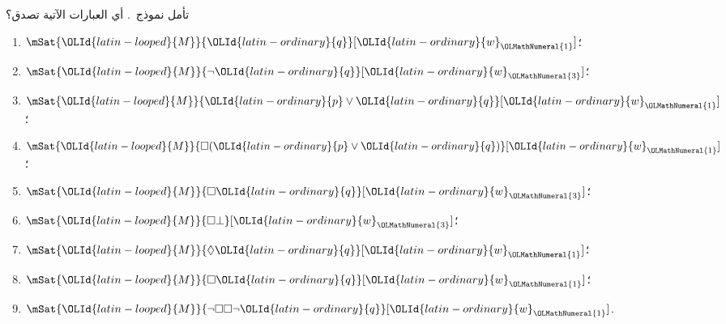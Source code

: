 \documentclass[../../../include/open-logic-section]{subfiles}
\begin{document}
\begin{prob}
  تأمل نموذج~. أي العبارات الآتية
  تصدق؟
    \begin{enumerate}
    \item $\mSat{{\OLId{latin-looped}{M}}}{{\OLId{latin-ordinary}{q}}}[{\OLId{latin-ordinary}{w}}_{\OLMathNumeral{1}}]$؛
    \item $\mSat{{\OLId{latin-looped}{M}}}{\lnot {\OLId{latin-ordinary}{q}}}[{\OLId{latin-ordinary}{w}}_{\OLMathNumeral{3}}]$؛
    \item $\mSat{{\OLId{latin-looped}{M}}}{{\OLId{latin-ordinary}{p}} \lor {\OLId{latin-ordinary}{q}}}[{\OLId{latin-ordinary}{w}}_{\OLMathNumeral{1}}]$؛
    \item $\mSat{{\OLId{latin-looped}{M}}}{\Box ({\OLId{latin-ordinary}{p}} \lor {\OLId{latin-ordinary}{q}})}[{\OLId{latin-ordinary}{w}}_{\OLMathNumeral{1}}]$؛
    \item $\mSat{{\OLId{latin-looped}{M}}}{\Box {\OLId{latin-ordinary}{q}}}[{\OLId{latin-ordinary}{w}}_{\OLMathNumeral{3}}]$؛
    \item $\mSat{{\OLId{latin-looped}{M}}}{\Box \bot}[{\OLId{latin-ordinary}{w}}_{\OLMathNumeral{3}}]$؛
    \item $\mSat{{\OLId{latin-looped}{M}}}{\Diamond {\OLId{latin-ordinary}{q}}}[{\OLId{latin-ordinary}{w}}_{\OLMathNumeral{1}}]$؛
    \item $\mSat{{\OLId{latin-looped}{M}}}{\Box {\OLId{latin-ordinary}{q}}}[{\OLId{latin-ordinary}{w}}_{\OLMathNumeral{1}}]$؛
    \item $\mSat{{\OLId{latin-looped}{M}}}{\lnot \Box\Box \lnot {\OLId{latin-ordinary}{q}}}[{\OLId{latin-ordinary}{w}}_{\OLMathNumeral{1}}]$.
    \end{enumerate}
\end{prob}
\end{document}
